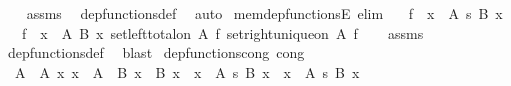 \begin{isabellebody}
%
\isadelimproof
\ \ %
\endisadelimproof
%
\isatagproof
{}\isamarkupfalse%
\ assms\ \isamarkupfalse%
\ dep{\isacharunderscore}{\kern0pt}functions{\isacharunderscore}{\kern0pt}def\ \isamarkupfalse%
\ auto%
\endisatagproof
{\isafoldproof}%
%
\isadelimproof
\isanewline
%
\endisadelimproof
\isanewline
{}\isamarkupfalse%
\ mem{\isacharunderscore}{\kern0pt}dep{\isacharunderscore}{\kern0pt}functionsE\ {\isacharbrackleft}{\kern0pt}elim{\isacharbrackright}{\kern0pt}{\isacharcolon}{\kern0pt}\isanewline
\ \ \ {\isachardoublequoteopen}f\ {\isasymin}\ {\isacharparenleft}{\kern0pt}x\ {\isasymin}\ A{\isacharparenright}{\kern0pt}\ {\isasymrightarrow}s\ {\isacharparenleft}{\kern0pt}B\ x{\isacharparenright}{\kern0pt}{\isachardoublequoteclose}\isanewline
\ \ \ {\isachardoublequoteopen}f\ {\isasymsubseteq}\ {\isasymSum}x\ {\isasymin}\ A{\isachardot}{\kern0pt}\ {\isacharparenleft}{\kern0pt}B\ x{\isacharparenright}{\kern0pt}{\isachardoublequoteclose}\ {\isachardoublequoteopen}set{\isacharunderscore}{\kern0pt}left{\isacharunderscore}{\kern0pt}total{\isacharunderscore}{\kern0pt}on\ A\ f{\isachardoublequoteclose}\ {\isachardoublequoteopen}set{\isacharunderscore}{\kern0pt}right{\isacharunderscore}{\kern0pt}unique{\isacharunderscore}{\kern0pt}on\ A\ f{\isachardoublequoteclose}\isanewline
%
\isadelimproof
\ \ %
\endisadelimproof
%
\isatagproof
{}\isamarkupfalse%
\ assms\ \isamarkupfalse%
\ dep{\isacharunderscore}{\kern0pt}functions{\isacharunderscore}{\kern0pt}def\ \isamarkupfalse%
\ blast%
\endisatagproof
{\isafoldproof}%
%
\isadelimproof
\isanewline
%
\endisadelimproof
\isanewline
{}\isamarkupfalse%
\ dep{\isacharunderscore}{\kern0pt}functions{\isacharunderscore}{\kern0pt}cong\ {\isacharbrackleft}{\kern0pt}cong{\isacharbrackright}{\kern0pt}{\isacharcolon}{\kern0pt}\isanewline
\ \ {\isachardoublequoteopen}{\isasymlbrakk}A\ {\isacharequal}{\kern0pt}\ A{\isacharprime}{\kern0pt}{\isacharsemicolon}{\kern0pt}\ {\isasymAnd}x{\isachardot}{\kern0pt}\ x\ {\isasymin}\ A{\isacharprime}{\kern0pt}\ {\isasymLongrightarrow}\ B\ x\ {\isacharequal}{\kern0pt}\ B{\isacharprime}{\kern0pt}\ x{\isasymrbrakk}\ {\isasymLongrightarrow}\ {\isacharparenleft}{\kern0pt}x\ {\isasymin}\ A{\isacharparenright}{\kern0pt}\ {\isasymrightarrow}s\ {\isacharparenleft}{\kern0pt}B\ x{\isacharparenright}{\kern0pt}\ {\isacharequal}{\kern0pt}\ {\isacharparenleft}{\kern0pt}x\ {\isasymin}\ A{\isacharprime}{\kern0pt}{\isacharparenright}{\kern0pt}\ {\isasymrightarrow}s\ {\isacharparenleft}{\kern0pt}B{\isacharprime}{\kern0pt}\ x{\isacharparenright}{\kern0pt}{\isachardoublequoteclose}\isanewline

\end{isabellebody}
